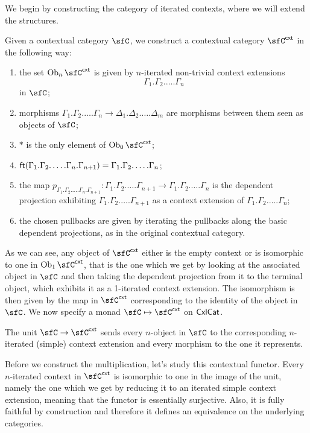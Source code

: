 We begin by constructing the category of iterated contexts, where we
will extend the structures.

\begin{construction}\cite[21]{Lum10}
  Given a contextual category $\sfC$, we construct a contextual category
  $\sfC^{\cxt}$ in the following way:
  \begin{enumerate}
    \item the set $\Ob_n\sfC^{\cxt}$ is given by $n$-iterated non-trivial context
      extensions
      \[\Gamma_1.\Gamma_2.\ldots.\Gamma_n\]
      in $\sfC$;
    \item morphisms
      $\Gamma_1.\Gamma_2.\ldots.\Gamma_n\rightarrow\Delta_1.\Delta_2.\ldots.\Delta_m$
      are morphisms between them seen as objects of $\sfC$;
    \item $*$ is the only element of $\Ob_0\sfC^{\cxt}$;
    \item
      $\operatorname{\mathsf{ft}}(\Gamma_1.\Gamma_2.\ldots.\Gamma_n.\Gamma_{n+1})=\Gamma_1.\Gamma_2.\ldots.\Gamma_n$;
    \item the map $p_{\Gamma_1.\Gamma_2.\ldots.\Gamma_n.\Gamma_{n+1}}\colon
      \Gamma_1.\Gamma_2.\ldots.\Gamma_{n+1}\rightarrow
      \Gamma_1.\Gamma_2.\ldots.\Gamma_n$ is the dependent projection exhibiting
      $\Gamma_1.\Gamma_2.\ldots.\Gamma_{n+1}$ as a context extension of
      $\Gamma_1.\Gamma_2.\ldots.\Gamma_n$;
    \item the chosen pullbacks are given by iterating the pullbacks along the
      basic dependent projections, as in the original contextual category.
  \end{enumerate}

  As we can see, any object of $\sfC^{\cxt}$ either is the empty context or is
  isomorphic to one in
  $\Ob_1\sfC^{\cxt}$, that is the one which we get by looking at the associated object
  in $\sfC$ and then taking the dependent projection from it to the terminal
  object, which exhibits it as a 1-iterated context extension. The isomorphism
  is then given by the map in $\sfC^{\cxt}$ corresponding to the identity of the
  object in $\sfC$. We now specify a monad $\sfC\mapsto\sfC^{\cxt}$ on $\operatorname{\mathsf{CxlCat}}$.

  The unit $\sfC\rightarrow\sfC^{\cxt}$ sends every $n$-object in $\sfC$ to
  the corresponding $n$-iterated (simple) context extension and every morphism
  to the one it represents.

  Before we construct the multiplication, let's study this contextual functor.
  Every $n$-iterated
  context in $\sfC^{\cxt}$ is isomorphic to one in the image of the unit, namely
  the one which we get by reducing it to an iterated simple context extension,
  meaning that the functor is essentially surjective. Also, it is fully faithful
  by construction and therefore it defines an equivalence on the underlying
  categories.


\end{construction}
